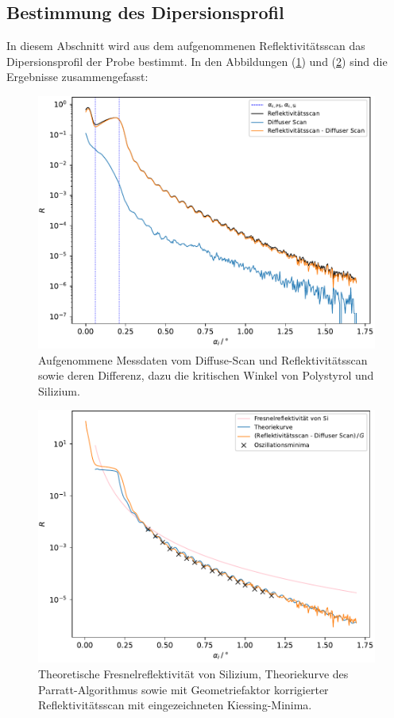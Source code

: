 \subsection{Bestimmung des Dipersionsprofil}
In diesem Abschnitt wird aus dem aufgenommenen Reflektivitätsscan das Dipersionsprofil der Probe bestimmt. In den Abbildungen (\ref{fig:messungr}) und (\ref{fig:messungr2}) sind die Ergebnisse zusammengefasst:
\begin{figure}[h!]
  \centering
  \includegraphics[scale=0.7]{fig/plot_messung.pdf}
  \caption{Aufgenommene Messdaten vom Diffuse-Scan und Reflektivitätsscan sowie deren Differenz, dazu die kritischen Winkel von Polystyrol und Silizium.}
  \label{fig:messungr}
\end{figure}
\FloatBarrier
\begin{figure}[h!]
  \centering
  \includegraphics[scale=0.7]{fig/plot_messung2.pdf}
  \caption{Theoretische Fresnelreflektivität von Silizium, Theoriekurve des Parratt-Algorithmus sowie mit Geometriefaktor korrigierter Reflektivitätsscan mit eingezeichneten Kiessing-Minima.}
  \label{fig:messungr2}
\end{figure}
